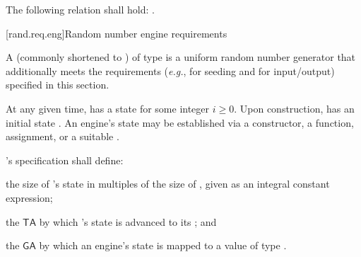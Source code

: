 \pnum
The following relation shall hold:
.
%



[rand.req.eng]{Random number engine requirements}%
%

\pnum
A 
(commonly shortened to )
 of type 
is a uniform random number generator
that additionally meets the requirements
(\textit{e.g.}, for seeding and for input/output)
specified in this section.

\pnum
At any given time,
 has a state 
for some integer $i \geq 0$.
Upon construction,
has an initial state .
An engine's state may be established via
 a constructor,
 a  function,
 assignment,
 or a suitable .

\pnum
{}'s specification shall define:
\begin{enumeratea}
 \item
   the size of 's state
   in multiples of the size of ,
   given as an integral constant expression;
 \item
   the 
   $ \mathsf{TA} $
   by which 's state 
   is advanced to its 
   ;
 and
 \item
   the 
   $ \mathsf{GA} $
   by which an engine's state is mapped
   to a value of type .
\end{enumeratea}


